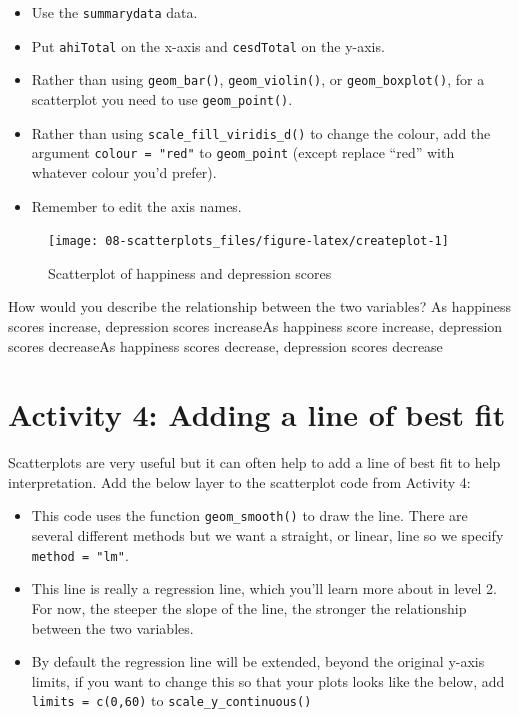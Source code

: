 \documentclass[
  oneside]{book}
\providecommand{\tightlist}{%
  \setlength{\itemsep}{0pt}\setlength{\parskip}{0pt}}
\begin{document}
\begin{itemize}
\tightlist
\item
  Use the \texttt{summarydata} data.
\item
  Put \texttt{ahiTotal} on the x-axis and \texttt{cesdTotal} on the y-axis.
\item
  Rather than using \texttt{geom\_bar()}, \texttt{geom\_violin()}, or \texttt{geom\_boxplot()}, for a scatterplot you need to use \texttt{geom\_point()}.
\item
  Rather than using \texttt{scale\_fill\_viridis\_d()} to change the colour, add the argument \texttt{colour\ =\ "red"} to \texttt{geom\_point} (except replace ``red'' with whatever colour you'd prefer).
\item
  Remember to edit the axis names.
\end{itemize}

\begin{figure}

{\centering \texttt{[image: 08-scatterplots\_files/figure-latex/createplot-1]} 

}

\caption{Scatterplot of happiness and depression scores}\label{fig:createplot}
\end{figure}

How would you describe the relationship between the two variables? As happiness scores increase, depression scores increaseAs happiness score increase, depression scores decreaseAs happiness scores decrease, depression scores decrease

\hypertarget{activity-4-adding-a-line-of-best-fit}{%
\section{Activity 4: Adding a line of best fit}\label{activity-4-adding-a-line-of-best-fit}}

Scatterplots are very useful but it can often help to add a line of best fit to help interpretation. Add the below layer to the scatterplot code from Activity 4:

\begin{itemize}
\tightlist
\item
  This code uses the function \texttt{geom\_smooth()} to draw the line. There are several different methods but we want a straight, or linear, line so we specify \texttt{method\ =\ "lm"}.
\item
  This line is really a regression line, which you'll learn more about in level 2. For now, the steeper the slope of the line, the stronger the relationship between the two variables.
\item
  By default the regression line will be extended, beyond the original y-axis limits, if you want to change this so that your plots looks like the below, add \texttt{limits\ =\ c(0,60)} to \texttt{scale\_y\_continuous()}
\end{itemize}
\end{document}
